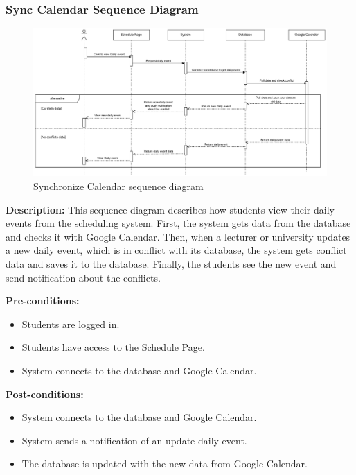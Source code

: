 \subsubsection{Sync Calendar Sequence Diagram}
    \begin{figure}[H]
        \centering
        \includegraphics[width=1\textwidth]{image/SyncCalendar.pdf} 
        \caption{Synchronize Calendar sequence diagram}
        \label{fig:sync_calendar_sequence}
    \end{figure}

    \textbf{Description:} This sequence diagram describes how students view their daily events from the scheduling system. 
    First, the system gets data from the database and checks it with Google Calendar. Then, when a lecturer or university updates a new daily event, which is in conflict with its database, the system gets conflict data and saves it to the database. 
    Finally, the students see the new event and send notification about the conflicts.

    \noindent \textbf{Pre-conditions:} 
        \begin{itemize}
            \item Students are logged in.
            \item Students have access to the Schedule Page.
            \item System connects to the database and Google Calendar.
        \end{itemize}
    \noindent \textbf{Post-conditions:}
    \begin{itemize}
        \item System connects to the database and Google Calendar.
        \item System sends a notification of an update daily event.
        \item The database is updated with the new data from Google Calendar.
    \end{itemize}

